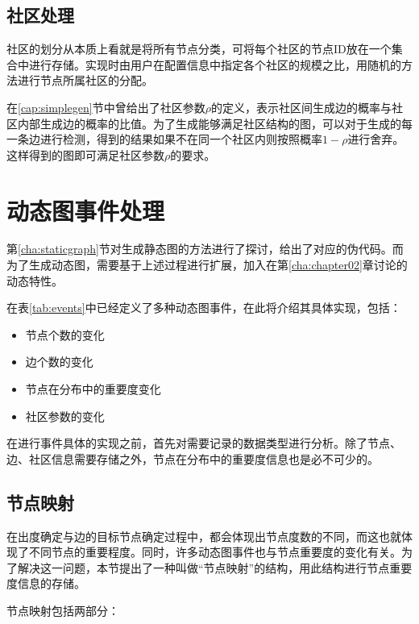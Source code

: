 \subsection{社区处理}
\label{cha:Community}

社区的划分从本质上看就是将所有节点分类，可将每个社区的节点ID放在一个集合中进行存储。实现时由用户在配置信息中指定各个社区的规模之比，用随机的方法进行节点所属社区的分配。

在\ref{cap:simplegen}节中曾给出了社区参数$\rho$的定义，表示社区间生成边的概率与社区内部生成边的概率的比值。为了生成能够满足社区结构的图，可以对于生成的每一条边进行检测，得到的结果如果不在同一个社区内则按照概率$1-\rho$进行舍弃。这样得到的图即可满足社区参数$\rho$的要求。

\section{动态图事件处理}
\label{cha:Dynamic_deal}

第\ref{cha:staticgraph}节对生成静态图的方法进行了探讨，给出了对应的伪代码。而为了生成动态图，需要基于上述过程进行扩展，加入在第\ref{cha:chapter02}章讨论的动态特性。

在表\ref{tab:events}中已经定义了多种动态图事件，在此将介绍其具体实现，包括：

\begin{itemize}
  \item 节点个数的变化
  \item 边个数的变化
  \item 节点在分布中的重要度变化
  \item 社区参数的变化
\end{itemize}

\vspace{0.2cm}

在进行事件具体的实现之前，首先对需要记录的数据类型进行分析。除了节点、边、社区信息需要存储之外，节点在分布中的重要度信息也是必不可少的。

\subsection{节点映射}
\label{cha:node_map}

在出度确定与边的目标节点确定过程中，都会体现出节点度数的不同，而这也就体现了不同节点的重要程度。同时，许多动态图事件也与节点重要度的变化有关。为了解决这一问题，本节提出了一种叫做“节点映射”的结构，用此结构进行节点重要度信息的存储。

节点映射包括两部分：

